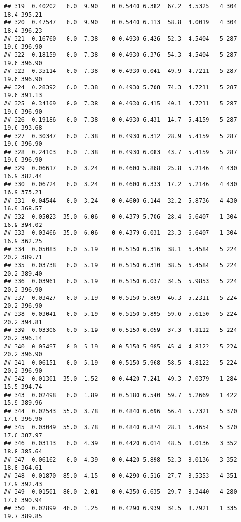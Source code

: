 \documentclass[
]{article}
\begin{document}
\begin{verbatim}
## 319  0.40202   0.0  9.90    0 0.5440 6.382  67.2  3.5325   4 304    18.4 395.21
## 320  0.47547   0.0  9.90    0 0.5440 6.113  58.8  4.0019   4 304    18.4 396.23
## 321  0.16760   0.0  7.38    0 0.4930 6.426  52.3  4.5404   5 287    19.6 396.90
## 322  0.18159   0.0  7.38    0 0.4930 6.376  54.3  4.5404   5 287    19.6 396.90
## 323  0.35114   0.0  7.38    0 0.4930 6.041  49.9  4.7211   5 287    19.6 396.90
## 324  0.28392   0.0  7.38    0 0.4930 5.708  74.3  4.7211   5 287    19.6 391.13
## 325  0.34109   0.0  7.38    0 0.4930 6.415  40.1  4.7211   5 287    19.6 396.90
## 326  0.19186   0.0  7.38    0 0.4930 6.431  14.7  5.4159   5 287    19.6 393.68
## 327  0.30347   0.0  7.38    0 0.4930 6.312  28.9  5.4159   5 287    19.6 396.90
## 328  0.24103   0.0  7.38    0 0.4930 6.083  43.7  5.4159   5 287    19.6 396.90
## 329  0.06617   0.0  3.24    0 0.4600 5.868  25.8  5.2146   4 430    16.9 382.44
## 330  0.06724   0.0  3.24    0 0.4600 6.333  17.2  5.2146   4 430    16.9 375.21
## 331  0.04544   0.0  3.24    0 0.4600 6.144  32.2  5.8736   4 430    16.9 368.57
## 332  0.05023  35.0  6.06    0 0.4379 5.706  28.4  6.6407   1 304    16.9 394.02
## 333  0.03466  35.0  6.06    0 0.4379 6.031  23.3  6.6407   1 304    16.9 362.25
## 334  0.05083   0.0  5.19    0 0.5150 6.316  38.1  6.4584   5 224    20.2 389.71
## 335  0.03738   0.0  5.19    0 0.5150 6.310  38.5  6.4584   5 224    20.2 389.40
## 336  0.03961   0.0  5.19    0 0.5150 6.037  34.5  5.9853   5 224    20.2 396.90
## 337  0.03427   0.0  5.19    0 0.5150 5.869  46.3  5.2311   5 224    20.2 396.90
## 338  0.03041   0.0  5.19    0 0.5150 5.895  59.6  5.6150   5 224    20.2 394.81
## 339  0.03306   0.0  5.19    0 0.5150 6.059  37.3  4.8122   5 224    20.2 396.14
## 340  0.05497   0.0  5.19    0 0.5150 5.985  45.4  4.8122   5 224    20.2 396.90
## 341  0.06151   0.0  5.19    0 0.5150 5.968  58.5  4.8122   5 224    20.2 396.90
## 342  0.01301  35.0  1.52    0 0.4420 7.241  49.3  7.0379   1 284    15.5 394.74
## 343  0.02498   0.0  1.89    0 0.5180 6.540  59.7  6.2669   1 422    15.9 389.96
## 344  0.02543  55.0  3.78    0 0.4840 6.696  56.4  5.7321   5 370    17.6 396.90
## 345  0.03049  55.0  3.78    0 0.4840 6.874  28.1  6.4654   5 370    17.6 387.97
## 346  0.03113   0.0  4.39    0 0.4420 6.014  48.5  8.0136   3 352    18.8 385.64
## 347  0.06162   0.0  4.39    0 0.4420 5.898  52.3  8.0136   3 352    18.8 364.61
## 348  0.01870  85.0  4.15    0 0.4290 6.516  27.7  8.5353   4 351    17.9 392.43
## 349  0.01501  80.0  2.01    0 0.4350 6.635  29.7  8.3440   4 280    17.0 390.94
## 350  0.02899  40.0  1.25    0 0.4290 6.939  34.5  8.7921   1 335    19.7 389.85

\end{verbatim}
\end{document}
